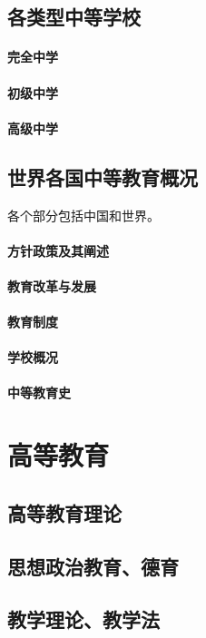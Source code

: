 \documentclass[UTF8]{../../ApplicationUniverse}
\begin{document}
\section{各类型中等学校}
    \subsubsection{完全中学}
    \subsubsection{初级中学}
    \subsubsection{高级中学}
\section{世界各国中等教育概况}
各个部分包括中国和世界。
    \subsubsection{方针政策及其阐述}
    \subsubsection{教育改革与发展}
    \subsubsection{教育制度}
    \subsubsection{学校概况}
    \subsubsection{中等教育史}


 
\chapter{高等教育}
\section{高等教育理论}
\section{思想政治教育、德育}
\section{教学理论、教学法}
\end{document}
